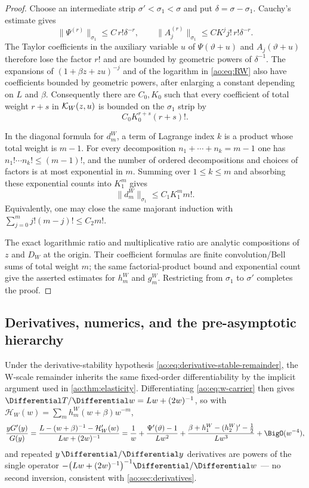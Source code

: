 \begin{proof}
Choose an intermediate strip
$\sigma'<\sigma_1<\sigma$ and put $\delta=\sigma-\sigma_1$.
Cauchy's estimate gives
\[
 \|\Psi^{(r)}\|_{\sigma_1}\le C\,r!\delta^{-r},
 \qquad
 \|A_j^{(r)}\|_{\sigma_1}
 \le CK^j j!\,r!\delta^{-r}.
\]
The Taylor coefficients in the auxiliary variable $u$ of
$\Psi(\vartheta+u)$ and $A_j(\vartheta+u)$ therefore lose the factor
$r!$ and are bounded by geometric powers of $\delta^{-1}$.  The expansions
of $(1+\beta z+zu)^{-j}$ and of the logarithm in
\eqref{ao:eq:RW} also have coefficients bounded by geometric powers, after
enlarging a constant depending on $L$ and $\beta$.  Consequently there are
$C_0,K_0$ such that every coefficient of total weight $r+s$ in
$\mathcal K_W(z,u)$ is bounded on the $\sigma_1$ strip by
\[
 C_0K_0^{r+s}(r+s)!.
\]

In the diagonal formula for $d_m^W$, a term of Lagrange index $k$ is a
product whose total weight is $m-1$.  For every decomposition
$n_1+\cdots+n_k=m-1$ one has
$n_1!\cdots n_k!\le(m-1)!$, and the number of ordered decompositions and
choices of factors is at most exponential in $m$.  Summing over
$1\le k\le m$ and absorbing these exponential counts into $K_1^m$ gives
\[
 \|d_m^W\|_{\sigma_1}\le C_1K_1^m m!.
\]
Equivalently, one may close the same majorant induction with
$\sum_{j=0}^m j!(m-j)!\le C_2m!$.

The exact logarithmic ratio and multiplicative ratio are analytic
compositions of $z$ and $D_W$ at the origin.  Their coefficient formulas are
finite convolution/Bell sums of total weight $m$; the same factorial-product
bound and exponential count give the asserted estimates for $h_m^W$ and
$g_m^W$.  Restricting from $\sigma_1$ to $\sigma'$ completes the proof.
\end{proof}

\subsection{Derivatives, numerics, and the pre-asymptotic hierarchy}

Under the derivative-stability hypothesis
\eqref{ao:eq:derivative-stable-remainder}, the W-scale remainder inherits the
same fixed-order differentiability by the implicit argument used in
\cref{ao:thm:elasticity}.  Differentiating \eqref{ao:eq:w-carrier} then gives
$\Differential T/\Differential w=Lw+(2w)^{-1}$, so with
$\mathcal H_W(w)=\sum_mh_m^W(w+\beta)w^{-m}$,
\begin{equation}
 \frac{yG'(y)}{G(y)}
 =\frac{L-(w+\beta)^{-1}-\mathcal H_W'(w)}{Lw+(2w)^{-1}}
 =\frac1w+\frac{\Psi'(\vartheta)-1}{Lw^{2}}
 +\frac{\beta+h_1^W-(h_2^W)'-\tfrac12}{Lw^{3}}
 +\BigO(w^{-4}),
 \label{ao:eq:W-elasticity}
\end{equation}
and repeated $y\,\Differential/\Differential y$ derivatives are powers of the single
operator $-\bigl(Lw+(2w)^{-1}\bigr)^{-1}\Differential/\Differential w$ --- no second
inversion, consistent with \cref{ao:sec:derivatives}.

